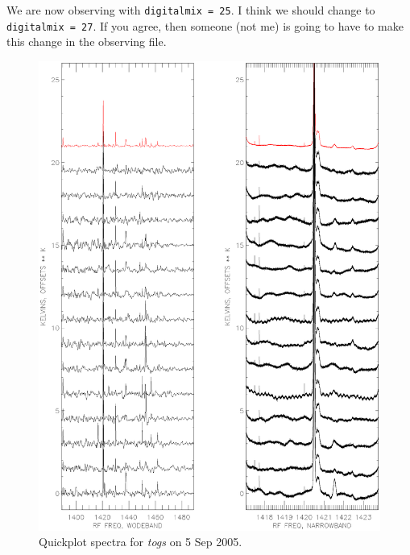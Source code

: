 \documentclass[psfig,preprint]{aastex}
\begin{document}
	We are now observing with \verb$digitalmix = 25$. I think we
should change to \verb$digitalmix = 27$. If you agree, then someone (not
me) is going to have to make this change in the observing file. 

\begin{figure}[!p]
\begin{center}
\includegraphics[width=6in]{quickplot_0905.togs.ps}   
\end{center}
\caption{Quickplot spectra for {\it togs} on 5 Sep 2005.\label{0905}}
\end{figure}
\end{document}
